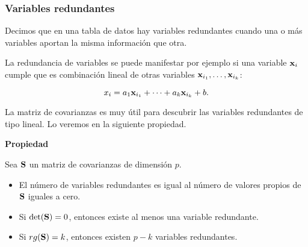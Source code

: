 \begin{frame}
\frametitle{Variables redundantes}


Decimos que  en una tabla de datos hay variables redundantes cuando una o más variables aportan la misma información
que otra. 

La redundancia de variables se puede manifestar por ejemplo si una variable $\mathbf{x}_i$ cumple que es combinación lineal de otras variables $\mathbf{x}_{i_1},\ldots ,\mathbf{x}_{i_k}$:

$$x_i=a_1 \mathbf{x}_{i_1}+\cdots+ a_k \mathbf{x}_{i_k}+b.$$


La matriz de covarianzas es muy útil para descubrir las variables redundantes de tipo lineal. Lo veremos en la siguiente propiedad.
\end{frame}

\begin{frame}
\textbf{Propiedad}

Sea $\mathbf{S}$ un matriz de covarianzas de dimensión $p$.

\begin{itemize}
\item El número de variables redundantes es igual al número de valores propios de $\mathbf{S}$ iguales a cero.
\item Si $\det(\mathbf{S})=0$, entonces existe al menos una variable redundante.
\item Si $rg(\mathbf{S})=k$, entonces existen $p-k$ variables redundantes.
\end{itemize}


\end{frame}


